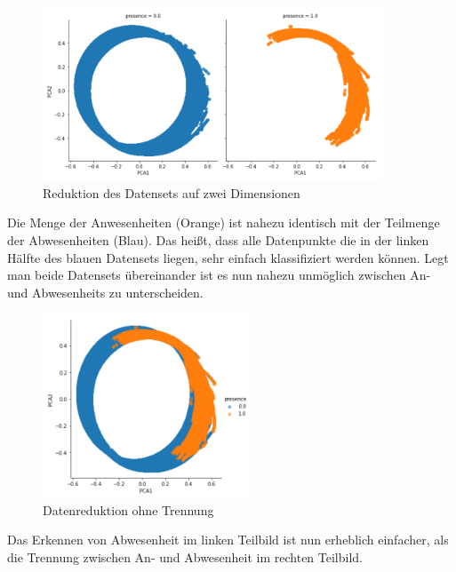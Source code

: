\begin{figure}[h]
    \centering
    \includegraphics[width=0.9\textwidth]{pic/pca.png}
    \caption{Reduktion des Datensets auf zwei Dimensionen}
    \label{fig:PT_eval}
\end{figure}

Die Menge der Anwesenheiten (Orange) ist nahezu identisch mit der Teilmenge der Abwesenheiten (Blau). Das heißt,
dass alle Datenpunkte die in der linken Hälfte des blauen Datensets liegen, sehr einfach klassifiziert 
werden können. 
\newpage
Legt man beide Datensets übereinander ist es nun nahezu unmöglich zwischen An- und Abwesenheits
zu unterscheiden.\\

\begin{figure}[h]
    \centering
    \includegraphics[width=0.55\textwidth]{pic/pca1.png}
    \caption{Datenreduktion ohne Trennung}
    \label{fig:PT_eval}
\end{figure}

Das Erkennen von Abwesenheit im linken Teilbild ist nun erheblich einfacher, als die Trennung zwischen 
An- und Abwesenheit im rechten Teilbild.\\
